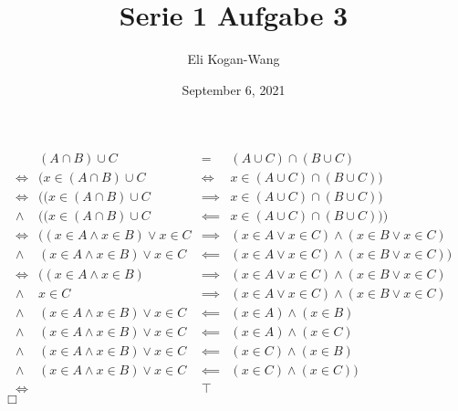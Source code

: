 \documentclass[a4paper,12pt]{article}
\title{Serie 1 Aufgabe 3}
\author{Eli Kogan-Wang}
\date{September 6, 2021}
\begin{document}
$$
  \begin{aligned}
          & (A\cap B)\cup C                  & =          & (A\cup C)\cap (B\cup C)                       \\
    \iff  & (x\in(A\cap B)\cup C             & \iff       & x\in(A\cup C)\cap (B\cup C))                  \\
    \iff  & ((x\in(A\cap B)\cup C            & \implies   & x\in(A\cup C)\cap (B\cup C))                  \\
    \land & ((x\in(A\cap B)\cup C            & \impliedby & x\in(A\cup C)\cap (B\cup C)))                 \\
    \iff  & ((x\in A\land x\in B)\lor x\in C & \implies   & (x\in A\lor x\in C)\land (x\in B\lor x\in C)  \\
    \land & (x\in A\land x\in B)\lor x\in C  & \impliedby & (x\in A\lor x\in C)\land (x\in B\lor x\in C)) \\
    \iff  & ((x\in A\land x\in B)            & \implies   & (x\in A\lor x\in C)\land (x\in B\lor x\in C)  \\
    \land & x\in C                           & \implies   & (x\in A\lor x\in C)\land (x\in B\lor x\in C)  \\
    \land & (x\in A\land x\in B)\lor x\in C  & \impliedby & (x\in A)\land (x\in B)                        \\
    \land & (x\in A\land x\in B)\lor x\in C  & \impliedby & (x\in A)\land (x\in C)                        \\
    \land & (x\in A\land x\in B)\lor x\in C  & \impliedby & (x\in C)\land (x\in B)                        \\
    \land & (x\in A\land x\in B)\lor x\in C  & \impliedby & (x\in C)\land (x\in C))                       \\
    \iff  &                                  & \top       &
  \end{aligned}
$$
$\Box$
\end{document}
